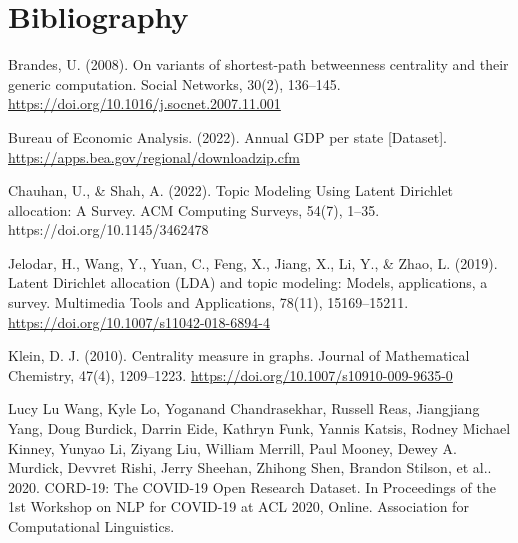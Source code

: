 \documentclass[10pt, a4paper, twocolumn]{article} %
\begin{document}
\hspace{20px}

\hspace{20px}

\hspace{20px}

\hspace{20px}

\hspace{20px}

\hspace{20px}

\hspace{20px}

\hspace{20px}

\pagebreak
\section{Bibliography}

\hspace{5px} Brandes, U. (2008). On variants of shortest-path betweenness centrality and their generic computation. Social Networks, 30(2), 136–145. \url{https://doi.org/10.1016/j.socnet.2007.11.001} \\

\vspace{-13px}

Bureau of Economic Analysis. (2022). Annual GDP per state [Dataset]. \url{https://apps.bea.gov/regional/downloadzip.cfm}

Chauhan, U., \& Shah, A. (2022). Topic Modeling Using Latent Dirichlet allocation: A Survey. ACM Computing Surveys, 54(7), 1–35. https://doi.org/10.1145/3462478

Jelodar, H., Wang, Y., Yuan, C., Feng, X., Jiang, X., Li, Y., \& Zhao, L. (2019). Latent Dirichlet allocation (LDA) and topic modeling: Models, applications, a survey. Multimedia Tools and Applications, 78(11), 15169–15211. \url{https://doi.org/10.1007/s11042-018-6894-4}

Klein, D. J. (2010). Centrality measure in graphs. Journal of Mathematical Chemistry, 47(4), 1209–1223. \url{https://doi.org/10.1007/s10910-009-9635-0}
 
Lucy Lu Wang, Kyle Lo, Yoganand Chandrasekhar, Russell Reas, Jiangjiang Yang, Doug Burdick, Darrin Eide, Kathryn Funk, Yannis Katsis, Rodney Michael Kinney, Yunyao Li, Ziyang Liu, William Merrill, Paul Mooney, Dewey A. Murdick, Devvret Rishi, Jerry Sheehan, Zhihong Shen, Brandon Stilson, et al.. 2020. CORD-19: The COVID-19 Open Research Dataset. In Proceedings of the 1st Workshop on NLP for COVID-19 at ACL 2020, Online. Association for Computational Linguistics.
\end{document}
